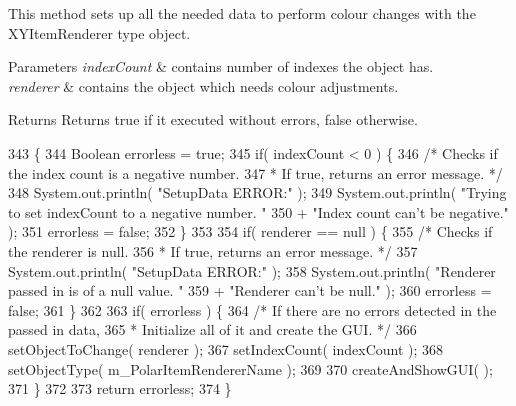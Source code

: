 This method sets up all the needed data to perform colour changes with the X\-Y\-Item\-Renderer type object. 
\begin{DoxyParams}{Parameters}
{\em index\-Count} & contains number of indexes the object has. \\
\hline
{\em renderer} & contains the object which needs colour adjustments. \\
\hline
\end{DoxyParams}
\begin{DoxyReturn}{Returns}
Returns true if it executed without errors, false otherwise. 
\end{DoxyReturn}

\begin{DoxyCode}
343                                                 \{
344         Boolean errorless = \textcolor{keyword}{true};
345         \textcolor{keywordflow}{if}( indexCount < 0 ) \{
346             \textcolor{comment}{/* Checks if the index count is a negative number.
}
347 \textcolor{comment}{             * If true, returns an error message. */}
348             System.out.println( \textcolor{stringliteral}{"SetupData ERROR:"} );
349             System.out.println( \textcolor{stringliteral}{"Trying to set indexCount to a negative number. "}
350                     + \textcolor{stringliteral}{"Index count can't be negative."} );
351             errorless = \textcolor{keyword}{false};
352         \}
353         
354         \textcolor{keywordflow}{if}(  renderer == null ) \{
355             \textcolor{comment}{/* Checks if the renderer is null.
}
356 \textcolor{comment}{             * If true, returns an error message. */}
357             System.out.println( \textcolor{stringliteral}{"SetupData ERROR:"} );
358             System.out.println( \textcolor{stringliteral}{"Renderer passed in is of a null value. "}
359                                + \textcolor{stringliteral}{"Renderer can't be null."} );
360             errorless = \textcolor{keyword}{false};
361         \}
362         
363         \textcolor{keywordflow}{if}( errorless ) \{
364             \textcolor{comment}{/* If there are no errors detected in the passed in data,
}
365 \textcolor{comment}{             * Initialize all of it and create the GUI. */}
366             setObjectToChange( renderer );
367             setIndexCount( indexCount );
368             setObjectType( m\_PolarItemRendererName );
369             
370             createAndShowGUI(  );
371         \}
372         
373         \textcolor{keywordflow}{return} errorless;
374     \}
\end{DoxyCode}
